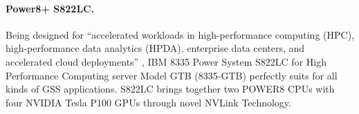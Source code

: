 \paragraph{Power8+ S822LC.}
Being designed for ``accelerated workloads in high-performance computing (HPC), high-performance data analytics (HPDA), enterprise data centers, and accelerated cloud deployments'' \cite{2015:power8,2016:power8}, IBM 8335 Power System S822LC for High Performance Computing server Model GTB (8335-GTB) perfectly suits for all kinds of GSS applications. %
S822LC brings together two POWER8 CPUs with four NVIDIA Tesla P100 GPUs through novel NVLink Technology.
